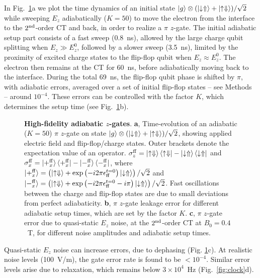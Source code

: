 \documentclass[aps,prb,superscriptaddress,nobibnotes,twocolumn]{revtex4-1}
\begin{document}
In Fig.~\ref{fig:z-gate}a we plot the time dynamics of an initial state $\ket{g}\otimes(\ket{\downarrow\Uparrow}+\ket{\uparrow\Downarrow})/\sqrt{2}$ while sweeping $E_z$ adiabatically ($K=50$) to move the electron from the interface to the $2^{\rm nd}$-order CT and back, in order to realize a $\pi$ $z$-gate. The initial adiabatic setup part consists of a fast sweep (0.8~ns), allowed by the large charge qubit splitting when $E_z \gg E_z^0$, followed by a slower sweep (3.5~ns), limited by the proximity of excited charge states to the flip-flop qubit when $E_z \approx E_z^0$. The electron then remains at the CT for 60~ns, before adiabatically moving back to the interface. During the total 69~ns, the flip-flop qubit phase is shifted by $\pi$, with adiabatic errors, averaged over a set of initial flip-flop states -- see Methods -- around $10^{-4}$. These errors can be controlled with the factor $K$, which determines the setup time (see Fig.~\ref{fig:z-gate}b).


\begin{figure}
	\centering
	\caption{\textbf{High-fidelity adiabatic $z$-gates}.
		\textbf{a}, Time-evolution of an adiabatic  ($K=50$) $\pi$ $z$-gate on state $\ket{g}\otimes(\ket{\downarrow\Uparrow}+\ket{\uparrow\Downarrow})/\sqrt{2}$, showing applied electric field and flip-flop/charge states. Outer brackets denote the expectation value of an operator. $\sigma_z^{\rm ff}=\ket{\uparrow\Downarrow}\bra{\uparrow\Downarrow}-\ket{\downarrow\Uparrow}\bra{\downarrow\Uparrow}$ and $\sigma_x^{\rm ff}=\ket{+_x^{\rm ff}}\bra{+_x^{\rm ff}}-\ket{-_x^{\rm ff}}\bra{-_x^{\rm ff}}$, where $\ket{+_x^{\rm ff}}=\left(\ket{\uparrow\Downarrow}+\exp{\left(-i2\pi\epsilon_{\rm ff}^{t=0}\right)}\ket{\downarrow\Uparrow}\right)/\sqrt{2}$ and $\ket{-_x^{\rm ff}}=\left(\ket{\uparrow\Downarrow}+\exp{\left(-i2\pi\epsilon_{\rm ff}^{t=0}-i\pi\right)}\ket{\downarrow\Uparrow}\right)/\sqrt{2}$. Fast oscillations between the charge and flip-flop states are due to small deviations from perfect adiabaticity.
		\textbf{b}, $\pi$ $z$-gate leakage error for different adiabatic setup times, which are set by the factor $K$.
		\textbf{c}, $\pi$ $z$-gate error due to quasi-static $E_z$ noise, at the $2^{\rm nd}$-order CT at $B_0=0.4$~T, for different noise amplitudes and adiabatic setup times.}
	\label{fig:z-gate}
\end{figure}


Quasi-static $E_z$ noise can increase errors, due to dephasing (Fig. \ref{fig:z-gate}c). At realistic noise levels (100~V/m), the gate error rate is found to be $<10^{-4}$. Similar error levels arise due to relaxation, which remains below $3\times10^4$~Hz (Fig.~\ref{fig:clock}d).
\end{document}
